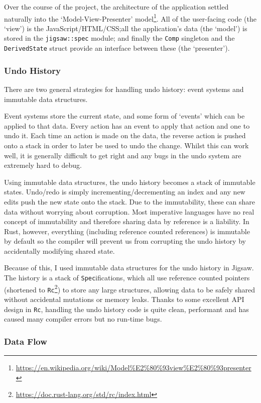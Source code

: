 \documentclass[12pt]{article}
\newcommand{\footurl}[1]{\footnote{\url{#1}}}
\begin{document}
Over the course of the project, the architecture of the application settled naturally into the
`Model-View-Presenter'
model\footurl{https://en.wikipedia.org/wiki/Model\%E2\%80\%93view\%E2\%80\%93presenter}.  All
of the user-facing code (the `view') is the JavaScript/HTML/CSS;\@ all the application's
data (the `model') is stored in the \verb|jigsaw::spec| module; and finally the \verb|Comp|
singleton and the \verb|DerivedState| struct provide an interface between these (the `presenter').

\subsubsection{Undo History}

There are two general strategies for handling undo history: event systems and immutable data
structures.

Event systems store the current state, and some form of `events' which can be applied to that data.
Every action has an event to apply that action and one to undo it.  Each time an action is
made on the data, the reverse action is pushed onto a stack in order to later be used to undo the
change.  Whilst this can work well, it is generally difficult to get right and any bugs in the undo
system are extremely hard to debug.

Using immutable data structures, the undo history becomes a stack of immutable states.  Undo/redo
is simply incrementing/decrementing an index and any new edits push the new state onto the stack.
Due to the immutability, these can share data without worrying about corruption.  Most imperative
languages have no real concept of immutability and therefore sharing data by reference is a
liability.  In Rust, however, everything (including reference counted references) is immutable by
default so the compiler will prevent us from corrupting the undo history by accidentally modifying
shared state.

Because of this, I used immutable data structures for the undo history in Jigsaw.  The history is a
stack of \verb|Spec|ifications, which all use reference counted pointers
(shortened to \verb|Rc|\footurl{https://doc.rust-lang.org/std/rc/index.html}) to store any large
structures, allowing data to be safely shared without accidental mutations or memory leaks.  Thanks
to some excellent API design in \verb|Rc|, handling the undo history code is quite clean, performant
and has caused many compiler errors but no run-time bugs.

\subsubsection{Data Flow}
\end{document}
